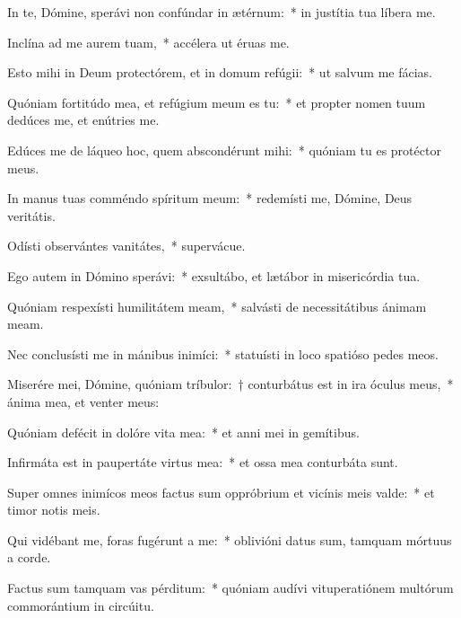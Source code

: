 \item In te, Dómine, sperávi non confúndar in ætérnum:~* in justítia tua líbera me.

\item Inclína ad me aurem tuam,~* accélera ut éruas me.

\item Esto mihi in Deum protectórem, et in domum refúgii:~* ut salvum me fácias.

\item Quóniam fortitúdo mea, et refúgium meum es tu:~* et propter nomen tuum dedúces me, et enútries me.

\item Edúces me de láqueo hoc, quem abscondérunt mihi:~* quóniam tu es protéctor meus.

\item In manus tuas comméndo spíritum meum:~* redemísti me, Dómine, Deus veritátis.

\item Odísti observántes vanitátes,~* supervácue.

\item Ego autem in Dómino sperávi:~* exsultábo, et lætábor in misericórdia tua.

\item Quóniam respexísti humilitátem meam,~* salvásti de necessitátibus ánimam meam.

\item Nec conclusísti me in mánibus inimíci:~* statuísti in loco spatióso pedes meos.

\item Miserére mei, Dómine, quóniam tríbulor:~† conturbátus est in ira óculus meus,~* ánima mea, et venter meus:

\item Quóniam defécit in dolóre vita mea:~* et anni mei in gemítibus.

\item Infirmáta est in paupertáte virtus mea:~* et ossa mea conturbáta sunt.

\item Super omnes inimícos meos factus sum oppróbrium et vicínis meis valde:~* et timor notis meis.

\item Qui vidébant me, foras fugérunt a me:~* oblivióni datus sum, tamquam mórtuus a corde.

\item Factus sum tamquam vas pérditum:~* quóniam audívi vituperatiónem multórum commorántium in circúitu.

